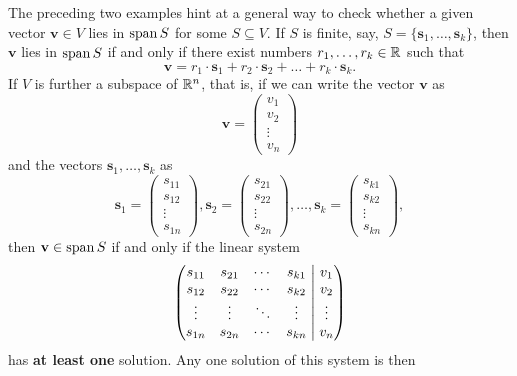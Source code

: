 The preceding two examples hint at a general way to check whether a given vector
$\mathbf{v} \in V$ lies in $\operatorname{span} S$ for some $S \subseteq V$. If $S$ is finite,
say, $S = \{\mathbf{s}_1,\ldots,\mathbf{s}_k\}$, then $\mathbf{v}$ lies in $\operatorname{span}
S$ if and only if there exist numbers $r_1,\ldots,r_k \in \mathbb{R}$ such that
\[
 \mathbf{v} = r_1 \cdot \mathbf{s}_1 + r_2 \cdot \mathbf{s}_2 + \ldots + r_k
 \cdot \mathbf{s}_k.
\]
If $V$ is further a subspace of $\mathbb{R}^{n}$, that is, if we can write the vector
$\mathbf{v}$ as
\[
 \mathbf{v} = 
 \begin{pmatrix}
  v_1\\
  v_2\\
  \vdots\\
  v_n
 \end{pmatrix}
\]
and the vectors $\mathbf{s}_1,\ldots,\mathbf{s}_k$ as
\[
 \mathbf{s}_1 = 
 \begin{pmatrix}
  s_{11}\\
  s_{12}\\
  \vdots\\
  s_{1n}
 \end{pmatrix},
 \mathbf{s}_2 = 
 \begin{pmatrix}
  s_{21}\\
  s_{22}\\
  \vdots\\
  s_{2n}
 \end{pmatrix},\ldots,
 \mathbf{s}_k = 
 \begin{pmatrix}
  s_{k1}\\
  s_{k2}\\
  \vdots\\
  s_{kn}
 \end{pmatrix},
\]
then $\mathbf{v} \in \operatorname{span} S$ if and only if the linear system
\[
 \left(
  \begin{matrix*}[c]
   s_{11} & s_{21} & \cdots & s_{k1}\\
   s_{12} & s_{22} & \cdots & s_{k2}\\
   \vdots & \vdots & \ddots & \vdots \\
   s_{1n} & s_{2n} & \cdots & s_{kn}
  \end{matrix*}
  \hspace{1mm}
 \right|
 \left.
  \begin{matrix*}[c]
   v_1\\
   v_2\\
   \vdots\\
   v_n
  \end{matrix*}
 \right)
\]
has \textbf{at least one} solution. Any one solution of this system is then
